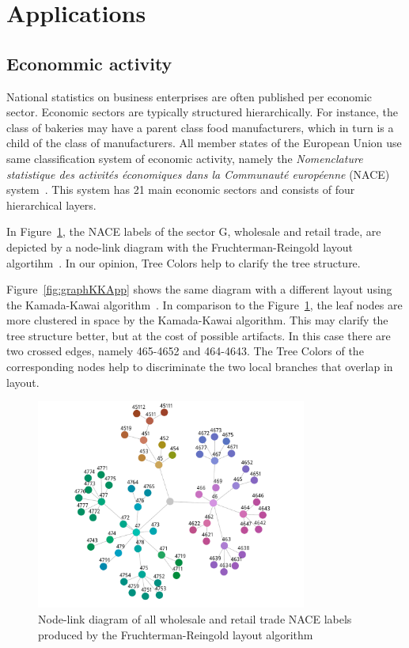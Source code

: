 \documentclass[review,journal]{vgtc}         %
\begin{document}


\section{Applications}\label{secapplication}

\subsection{Econommic activity}

National statistics on business enterprises are often published per economic sector. Economic sectors are typically structured hierarchically. For instance, the class of bakeries may have a parent class food manufacturers, which in turn is a child of the class of manufacturers. All member states of the European Union use same classification system of economic activity, namely the \textit{Nomenclature statistique des activit\'es \'economiques dans la Communaut\'e europ\'eenne} (NACE) system~\cite{nace}. This system has 21 main economic sectors and consists of four hierarchical layers.

In Figure~\ref{fig:graphFRApp}, the NACE labels of the sector G, wholesale and retail trade, are depicted by a node-link diagram with the Fruchterman-Reingold layout algortihm~\cite{Fruchterman91}. In our opinion, Tree Colors help to clarify the tree structure.


Figure~\ref{fig:graphKKApp} shows the same diagram with a different layout using the Kamada-Kawai algorithm~\cite{Kamada89}. In comparison to the Figure~\ref{fig:graphFRApp}, the leaf nodes are more clustered in space by the Kamada-Kawai algorithm. This may clarify the tree structure better, but at the cost of possible artifacts. In this case there are two crossed edges, namely 465-4652 and 464-4643. The Tree Colors of the corresponding nodes help to discriminate the two local branches that overlap in layout.

\begin{figure}[t]
  \centering
  \includegraphics[width=3.5in]{Gbusiness_FR.pdf}
  \caption{Node-link diagram of all wholesale and retail trade NACE labels produced by the Fruchterman-Reingold layout algorithm}\label{fig:graphFRApp}
\end{figure}
\end{document}
